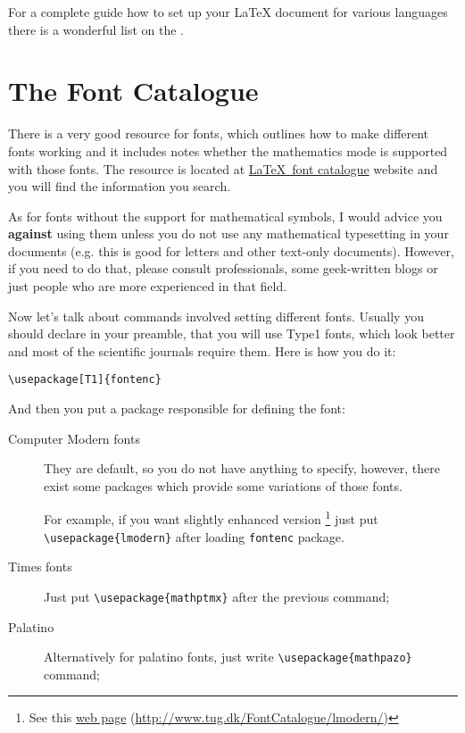 For a complete guide how to set up your \LaTeX{} document for various languages
there is a wonderful list on the
.

\section{The Font Catalogue}

There is a very good resource for fonts, which outlines how to make different
fonts working and it includes notes whether the mathematics mode is supported
with those fonts. 
%
The resource is located at \href{http://www.tug.dk/FontCatalogue/}{\LaTeX\ font
catalogue} website and you will find the information you search.

As for fonts without the support for mathematical symbols, I would advice you
\textbf{against} using them unless you do not use any mathematical  typesetting
in your documents (e.g. this is good for letters and other text-only documents).
%
However, if you need to do that, please consult professionals, some geek-written
blogs or just people who are more experienced in that field.

Now let's talk about commands involved setting different fonts. 
%
Usually you should declare in your preamble, that you will use Type1 fonts,
which look better and most of the scientific journals require them. 
%
Here is how you do it:
\begin{lstlisting}
\usepackage[T1]{fontenc}
\end{lstlisting}

And then you put a package responsible for defining the font:
\begin{description}
    \item[Computer Modern fonts] They are default, so you do not have anything
        to specify, however, there exist some packages which provide some
        variations of those fonts.
        
        For example, if you want slightly enhanced version
        \footnote{See this
        \href{http://www.tug.dk/FontCatalogue/lmodern/}{web page}
        (\url{http://www.tug.dk/FontCatalogue/lmodern/})}
        just put \verb|\usepackage{lmodern}| after loading \verb|fontenc|
        package.
    \item[Times fonts] Just put \verb|\usepackage{mathptmx}| after the previous
        command;
    \item[Palatino] Alternatively for palatino fonts, just write
        \verb|\usepackage{mathpazo}| command;
\end{description}

